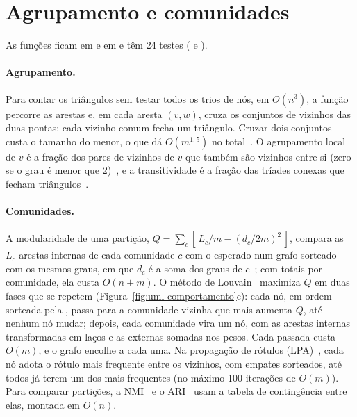 \section{Agrupamento e comunidades}\label{sec:comunidades}

As funções ficam em  e em  e têm 24 testes
( e ).

\paragraph{Agrupamento.} Para contar os triângulos sem testar todos os trios de nós, em $O(n^3)$, a
função  percorre as arestas e, em cada aresta $(v, w)$, cruza os conjuntos de
vizinhos das duas pontas: cada vizinho comum fecha um triângulo. Cruzar dois conjuntos custa o
tamanho do menor, o que dá $O(m^{1{,}5})$ no total~\cite{schank2005}. O agrupamento local de $v$ é a
fração dos pares de vizinhos de $v$ que também são vizinhos entre si (zero se o grau é menor que
2)~\cite{watts1998}, e a transitividade é a fração das tríades conexas que fecham
triângulos~\cite{newman2018}.

\paragraph{Comunidades.} A modularidade de uma partição,
$Q = \sum_c [\, L_c/m - (d_c/2m)^2 \,]$, compara as $L_c$ arestas internas de cada comunidade $c$
com o esperado num grafo sorteado com os mesmos graus, em que $d_c$ é a soma dos graus de
$c$~\cite{newman2004}; com totais por comunidade, ela custa $O(n + m)$. O método de
Louvain~\cite{blondel2008} maximiza $Q$ em duas fases que se repetem
(Figura~\ref{fig:uml-comportamento}c): cada nó, em ordem sorteada pela , passa
para a comunidade vizinha que mais aumenta $Q$, até nenhum nó mudar; depois, cada comunidade vira
um nó, com as arestas internas transformadas em laços e as externas somadas nos pesos. Cada
passada custa $O(m)$, e o grafo encolhe a cada uma. Na propagação de rótulos
(LPA)~\cite{raghavan2007}, cada nó adota o rótulo mais frequente entre os vizinhos, com empates
sorteados, até todos já terem um dos mais frequentes (no máximo 100 iterações de $O(m)$). Para
comparar partições, a NMI~\cite{danon2005} e o ARI~\cite{hubert1985} usam a tabela de contingência
entre elas, montada em $O(n)$.

